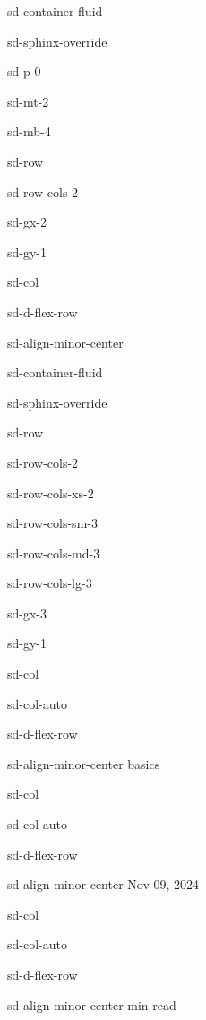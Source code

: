 \documentclass[letterpaper,10pt,english]{jupyterBook}
\begin{document}
\begin{sphinxuseclass}{sd-container-fluid}
\begin{sphinxuseclass}{sd-sphinx-override}
\begin{sphinxuseclass}{sd-p-0}
\begin{sphinxuseclass}{sd-mt-2}
\begin{sphinxuseclass}{sd-mb-4}
\begin{sphinxuseclass}{sd-row}
\begin{sphinxuseclass}{sd-row-cols-2}
\begin{sphinxuseclass}{sd-gx-2}
\begin{sphinxuseclass}{sd-gy-1}
\begin{sphinxuseclass}{sd-col}
\begin{sphinxuseclass}{sd-d-flex-row}
\begin{sphinxuseclass}{sd-align-minor-center}
\begin{sphinxuseclass}{sd-container-fluid}
\begin{sphinxuseclass}{sd-sphinx-override}
\begin{sphinxuseclass}{sd-row}
\begin{sphinxuseclass}{sd-row-cols-2}
\begin{sphinxuseclass}{sd-row-cols-xs-2}
\begin{sphinxuseclass}{sd-row-cols-sm-3}
\begin{sphinxuseclass}{sd-row-cols-md-3}
\begin{sphinxuseclass}{sd-row-cols-lg-3}
\begin{sphinxuseclass}{sd-gx-3}
\begin{sphinxuseclass}{sd-gy-1}
\begin{sphinxuseclass}{sd-col}
\begin{sphinxuseclass}{sd-col-auto}
\begin{sphinxuseclass}{sd-d-flex-row}
\begin{sphinxuseclass}{sd-align-minor-center}
\sphinxAtStartPar
basics

\end{sphinxuseclass}
\end{sphinxuseclass}
\end{sphinxuseclass}
\end{sphinxuseclass}
\begin{sphinxuseclass}{sd-col}
\begin{sphinxuseclass}{sd-col-auto}
\begin{sphinxuseclass}{sd-d-flex-row}
\begin{sphinxuseclass}{sd-align-minor-center}
\sphinxAtStartPar
Nov 09, 2024

\end{sphinxuseclass}
\end{sphinxuseclass}
\end{sphinxuseclass}
\end{sphinxuseclass}
\begin{sphinxuseclass}{sd-col}
\begin{sphinxuseclass}{sd-col-auto}
\begin{sphinxuseclass}{sd-d-flex-row}
\begin{sphinxuseclass}{sd-align-minor-center}
 min read


\end{sphinxuseclass}
\end{sphinxuseclass}
\end{sphinxuseclass}
\end{sphinxuseclass}
\end{sphinxuseclass}
\end{sphinxuseclass}
\end{sphinxuseclass}
\end{sphinxuseclass}
\end{sphinxuseclass}
\end{sphinxuseclass}
\end{sphinxuseclass}
\end{sphinxuseclass}
\end{sphinxuseclass}
\end{sphinxuseclass}
\end{sphinxuseclass}
\end{sphinxuseclass}
\end{sphinxuseclass}
\end{sphinxuseclass}
\end{sphinxuseclass}
\end{sphinxuseclass}
\end{sphinxuseclass}
\end{sphinxuseclass}
\end{sphinxuseclass}
\end{sphinxuseclass}
\end{sphinxuseclass}
\end{sphinxuseclass}
\end{document}
